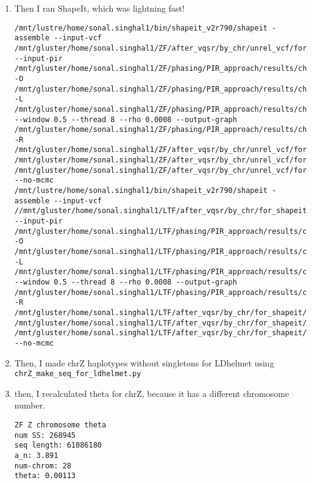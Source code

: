 \documentclass[idxtotoc,hyperref,openany,oneside]{labbook} %
\begin{document}
\begin{enumerate}
\begin{enumerate}
\begin{verbatim}
missing = [12297573, 25324470, 31785435, 61311164]
/mnt/lustre/home/sonal.singhal1/bin/shapeit_v2r790/shapeit -check --input-vcf /mnt/gluster/home/sonal.singhal1/LTF/after_vqsr/by_chr/for_shapeit/gatk.ug.ltf.chrZ.filtered.coverage.repeatmasked.recodedsex.recoded_biallelicSNPs.males.vcf.gz -R /mnt/gluster/home/sonal.singhal1/LTF/after_vqsr/by_chr/for_shapeit/femalehaps.hap.gz /mnt/gluster/home/sonal.singhal1/LTF/after_vqsr/by_chr/for_shapeit/femalehaps.legend.gz /mnt/gluster/home/sonal.singhal1/LTF/after_vqsr/by_chr/for_shapeit/femalehaps.sample --output-log /mnt/gluster/home/sonal.singhal1/LTF/after_vqsr/by_chr/for_shapeit/chrZ.alignmenterrors.txt
\end{verbatim}
\item Then I ran ShapeIt, which was lightning fast!
\begin{verbatim}
/mnt/lustre/home/sonal.singhal1/bin/shapeit_v2r790/shapeit -assemble --input-vcf /mnt/gluster/home/sonal.singhal1/ZF/after_vqsr/by_chr/unrel_vcf/for_shapeit/gatk.ug.unrel_zf.chrZ.coverage.repeatmasked.filtered.recodedsex.recoded_biallelicSNPs.nomendel.males.vcf.gz --input-pir /mnt/gluster/home/sonal.singhal1/ZF/phasing/PIR_approach/results/chrZ_PIRlist -O /mnt/gluster/home/sonal.singhal1/ZF/phasing/PIR_approach/results/chrZ_haplotypes -L /mnt/gluster/home/sonal.singhal1/ZF/phasing/PIR_approach/results/chrZ_haplotypes --window 0.5 --thread 8 --rho 0.0008 --output-graph /mnt/gluster/home/sonal.singhal1/ZF/phasing/PIR_approach/results/chrZ_haplotypes.graph -R /mnt/gluster/home/sonal.singhal1/ZF/after_vqsr/by_chr/unrel_vcf/for_shapeit/femalehaps.hap.gz /mnt/gluster/home/sonal.singhal1/ZF/after_vqsr/by_chr/unrel_vcf/for_shapeit/femalehaps.legend.gz /mnt/gluster/home/sonal.singhal1/ZF/after_vqsr/by_chr/unrel_vcf/for_shapeit/femalehaps.sample --no-mcmc
/mnt/lustre/home/sonal.singhal1/bin/shapeit_v2r790/shapeit -assemble --input-vcf //mnt/gluster/home/sonal.singhal1/LTF/after_vqsr/by_chr/for_shapeit/gatk.ug.ltf.chrZ.filtered.coverage.repeatmasked.recodedsex.recoded_biallelicSNPs.males.vcf.gz --input-pir /mnt/gluster/home/sonal.singhal1/LTF/phasing/PIR_approach/results/chrZ_PIRlist -O /mnt/gluster/home/sonal.singhal1/LTF/phasing/PIR_approach/results/chrZ_haplotypes -L /mnt/gluster/home/sonal.singhal1/LTF/phasing/PIR_approach/results/chrZ_haplotypes --window 0.5 --thread 8 --rho 0.0008 --output-graph /mnt/gluster/home/sonal.singhal1/LTF/phasing/PIR_approach/results/chrZ_haplotypes.graph -R /mnt/gluster/home/sonal.singhal1/LTF/after_vqsr/by_chr/for_shapeit/femalehaps.hap.gz /mnt/gluster/home/sonal.singhal1/LTF/after_vqsr/by_chr/for_shapeit/femalehaps.legend.gz /mnt/gluster/home/sonal.singhal1/LTF/after_vqsr/by_chr/for_shapeit/femalehaps.sample --no-mcmc
\end{verbatim}
\item Then, I made chrZ haplotypes without singletons for LDhelmet using \verb+chrZ_make_seq_for_ldhelmet.py+
\item then, I recalculated theta for chrZ, because it has a different chromosome number.
\begin{verbatim}
ZF Z chromosome theta
num SS: 268945
seq length: 61086180
a_n: 3.891
num-chrom: 28
theta: 0.00113


\end{verbatim}
\end{enumerate}
\end{enumerate}
\end{document}
